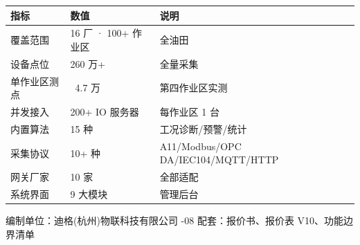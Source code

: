 \documentclass[11pt,a4paper]{ctexart}
\begin{document}
\begin{table}[H]\centering
\begin{tabular}{p{3.5cm} p{3.0cm} p{5.0cm}}
\toprule
\textbf{指标} & \textbf{数值} & \textbf{说明} \\
\midrule
覆盖范围 & 16 厂 · 100+ 作业区 & 全油田 \\
设备点位 & 260 万+ & 全量采集 \\
单作业区测点 & ~4.7 万 & 第四作业区实测 \\
并发接入 & 200+ IO 服务器 & 每作业区 1 台 \\
内置算法 & 15 种 & 工况诊断/预警/统计 \\
采集协议 & 10+ 种 & A11/Modbus/OPC DA/IEC104/MQTT/HTTP \\
网关厂家 & 10 家 & 全部适配 \\
系统界面 & 9 大模块 & 管理后台 \\
\bottomrule
\end{tabular}
\end{table}

\vspace{1em}\noindent\hrulefill
\begin{center}\small
编制单位：迪格(杭州)物联科技有限公司 -08 \quad 配套：报价书、报价表 V10、功能边界清单
\end{center}
\end{document}
